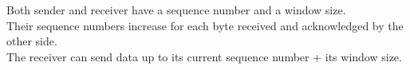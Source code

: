 Both sender and receiver have a sequence number and a window size.\\
Their sequence numbers increase for each byte received and acknowledged by the other side.\\
The receiver can send data up to its current sequence number + its window size.